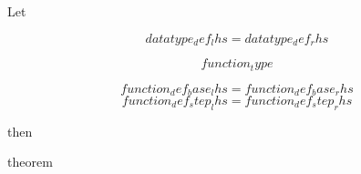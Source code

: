 \documentclass[a4paper]{article}
\begin{document}
\pagestyle{empty}

\begin{center}


\fontsize{18}{5}\selectfont
Let\\
\vspace{0.65cm}

$${{{datatype_def_lhs}}} = {{{datatype_def_rhs}}}$$

$${{{function_type}}}$$

$${{{function_def_base_lhs}}} = {{{function_def_base_rhs}}}$$
$${{{function_def_step_lhs}}} = {{{function_def_step_rhs}}}$$

\vspace{0.3cm}
then

\fontsize{20}{5}\selectfont

{{{theorem}}}

\end{center}
\end{document}
